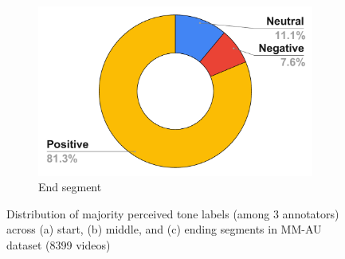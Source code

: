 \begin{figure}
\begin{subfigure}{.33\textwidth}
  \centering
  \includegraphics[width=.8\linewidth]{figures/end_tone_majority.pdf}
  \caption{End segment}
  \label{end_tone}
\end{subfigure}
\caption{Distribution of majority perceived tone labels (among 3 annotators) across (a) start, (b) middle, and (c) ending segments in MM-AU dataset (8399 videos) }
\label{start_mid_end_tone}
\end{figure}

